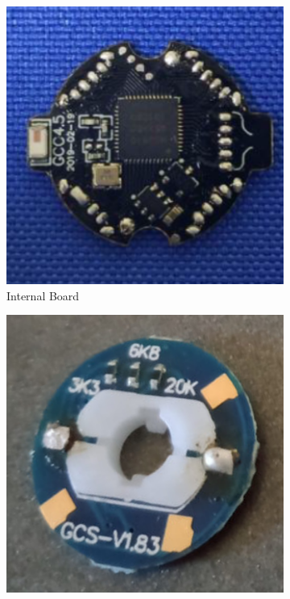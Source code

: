\begin{figure}
    \centering
    \begin{subfigure}{0.25\textwidth}
        \centering
        \includegraphics[width=.90\linewidth]{Figures/3 State of the Art/giiker-internal-board.png}
        \caption{Internal Board \cite{giiker-internals}}
        \label{fig:giiker-internal-board}
    \end{subfigure}%
    \begin{subfigure}{0.25\textwidth}
        \centering
        \includegraphics[width=.90\linewidth]{Figures/3 State of the Art/giiker-center-front.png}

\end{subfigure}
\end{figure}
